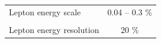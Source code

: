 \begin{table}[!htb]
\begin{center}
\begin{tabular}{|lc|}
Lepton energy scale & 0.04 -- 0.3 \% \\ 
\vspace{-0.4cm} & \\
Lepton energy resolution & 20 \% \\ 
\hline %
\hline %
\end{tabular}
\normalsize
\end{center}
\end{table}



